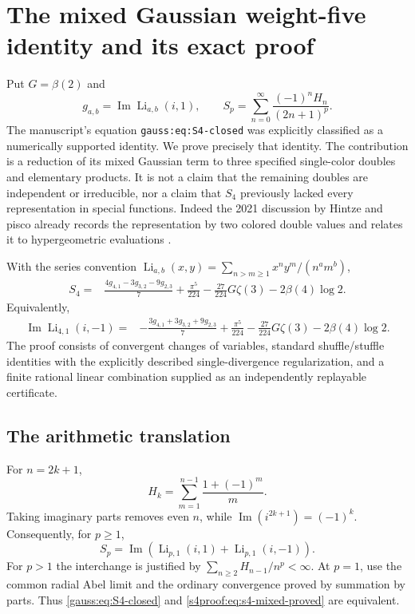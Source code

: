\section{The mixed Gaussian weight-five identity and its exact proof}
\label{s4proof:sec:s4-proof}

Put $G=\beta(2)$ and
\[
 g_{a,b}=\operatorname{Im}\operatorname{Li}_{a,b}(i,1),
 \qquad
 S_p=\sum_{n=0}^{\infty}\frac{(-1)^nH_n}{(2n+1)^p}.
\]
The manuscript's equation \texttt{gauss:eq:S4-closed} was explicitly
classified as a numerically supported identity. We prove precisely that
identity. The contribution is a reduction of its mixed Gaussian term to
three specified single-color doubles and elementary products. It is not a
claim that the remaining doubles are independent or irreducible, nor a
claim that $S_4$ previously lacked every representation in special functions.
Indeed the 2021 discussion by Hintze and pisco already records the
representation by two colored double values and relates it to
hypergeometric evaluations \cite{s4proof:hintze2021s4,s4proof:mhzhao2020}.

\begin{theorem}\label{s4proof:thm:s4}\label{gaussian:conj:S4}\label{gaussian:thm:S4}
With the series convention
$\operatorname{Li}_{a,b}(x,y)=\sum_{n>m\ge1}x^ny^m/(n^am^b)$,
\begin{align}
 S_4={}&\frac{4g_{4,1}-3g_{3,2}-9g_{2,3}}7
       +\frac{\pi^5}{224}
       -\frac{27}{224}G\zeta(3)-2\beta(4)\log2.
 \label{gauss:eq:S4-closed}
\end{align}
Equivalently,
\begin{align}
 \operatorname{Im}\operatorname{Li}_{4,1}(i,-1)
 ={}&-\frac{3g_{4,1}+3g_{3,2}+9g_{2,3}}7
       +\frac{\pi^5}{224}
       -\frac{27}{224}G\zeta(3)-2\beta(4)\log2.
 \label{s4proof:eq:s4-mixed-proved}
\end{align}
The proof consists of convergent changes of variables, standard
shuffle/stuffle identities with the explicitly described single-divergence
regularization, and a finite rational linear combination supplied as an
independently replayable certificate.
\end{theorem}

\subsection{The arithmetic translation}
For $n=2k+1$,
\[
 H_k=\sum_{m=1}^{n-1}\frac{1+(-1)^m}{m}.
\]
Taking imaginary parts removes even $n$, while
$\operatorname{Im}(i^{2k+1})=(-1)^k$. Consequently, for $p\ge1$,
\begin{equation}\label{gaussian:eq:S-mixed}
 S_p=\operatorname{Im}\left(
 \operatorname{Li}_{p,1}(i,1)+\operatorname{Li}_{p,1}(i,-1)\right).
\end{equation}
For $p>1$ the interchange is justified by
$\sum_{n\ge2}H_{n-1}/n^p<\infty$. At $p=1$, use the common radial
Abel limit and the ordinary convergence proved by summation by parts.
Thus \eqref{gauss:eq:S4-closed} and \eqref{s4proof:eq:s4-mixed-proved} are equivalent.

